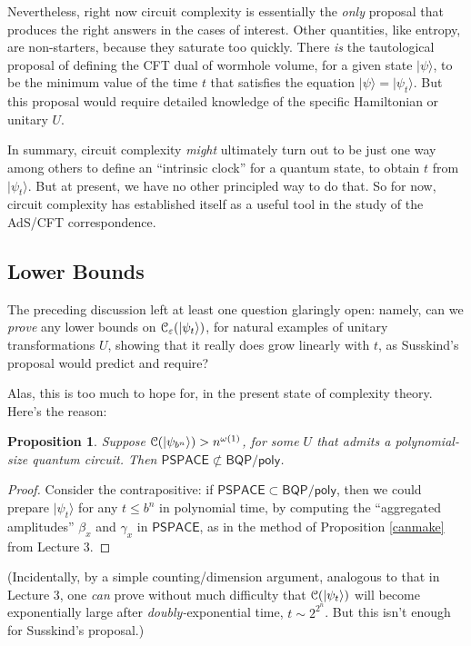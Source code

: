 \documentclass[12pt]{report}
\theoremstyle{plain}
\newtheorem{proposition}[theorem]{Proposition}
\theoremstyle{definition}
\newcommand{\eps}{\varepsilon}
\renewcommand{\ket}[1]{|#1\rangle}
\begin{document}
Nevertheless, right now circuit complexity is essentially the {\em only} proposal that produces the right answers in the cases of interest.  Other quantities, like entropy, are non-starters, because they saturate too quickly.  There {\em is} the tautological proposal of defining the CFT dual of wormhole volume, for a given state $\ket{\psi}$, to be the minimum value of the time $t$ that satisfies the equation $\ket{\psi}=\ket{\psi_t}$.  But this proposal would require detailed knowledge of the specific Hamiltonian or unitary $U$.

In summary, circuit complexity {\em might} ultimately turn out to be just one way among others to define an ``intrinsic clock'' for a quantum state, to obtain $t$ from $\ket{\psi_t}$.  But at present, we have no other principled way to do that.  So for now, circuit complexity has established itself as a useful tool in the study of the AdS/CFT correspondence.

\subsection{Lower Bounds}

The preceding discussion left at least one question glaringly open: namely, can we \emph{prove} any lower bounds on ${\cal C}_\eps(\ket{\psi_t})$, for natural examples of unitary transformations $U$, showing that it really does grow linearly with $t$, as Susskind's proposal would predict and require?

Alas, this is too much to hope for, in the present state of complexity theory.  Here's the reason:

\begin{proposition}
\label{nope}
Suppose ${\cal C}(\ket{\psi_{b^n}}) > n^{\omega(1)}$, for some $U$ that admits a polynomial-size quantum circuit.  Then $\mathsf{PSPACE} \not\subset \mathsf{BQP/poly}$.
\end{proposition}
\begin{proof}
Consider the contrapositive: if $\mathsf{PSPACE} \subset \mathsf{BQP/poly}$, then we could prepare $\ket{\psi_{t}}$ for any $t\leq b^n$ in polynomial time, by computing the ``aggregated amplitudes'' $\beta_x$ and $\gamma_x$ in $\mathsf{PSPACE}$, as in the method of Proposition \ref{canmake} from Lecture 3.
\end{proof}

(Incidentally, by a simple counting/dimension argument, analogous to that in Lecture 3, one {\em can} prove without much difficulty that ${\cal C}(\ket{\psi_t})$ will become exponentially large after {\em doubly-}exponential time, $t\sim 2^{2^n}$.  But this isn't enough for Susskind's proposal.)
\end{document}
